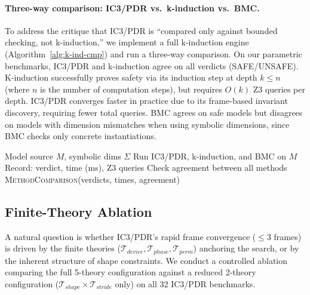 \documentclass[11pt]{article}
\begin{document}
\paragraph{Three-way comparison: IC3/PDR vs.\ k-induction vs.\ BMC.}
To address the critique that IC3/PDR is ``compared only against bounded
checking, not k-induction,'' we implement a full k-induction engine
(Algorithm~\ref{alg:k-ind-cmp}) and run a three-way comparison.
On our parametric benchmarks, IC3/PDR and k-induction agree on all
verdicts (SAFE/UNSAFE).  K-induction successfully proves safety
via its induction step at depth $k \leq n$ (where $n$ is the
number of computation steps), but requires $O(k)$ Z3 queries per depth.
IC3/PDR converges faster in practice due to its frame-based invariant
discovery, requiring fewer total queries.
BMC agrees on safe models but disagrees on models with dimension
mismatches when using symbolic dimensions, since BMC checks only
concrete instantiations.

\begin{algorithm}[t]
\caption{Three-Way Verification Comparison}\label{alg:k-ind-cmp}
\begin{algorithmic}[1]
\Require Model source $M$, symbolic dims $\Sigma$
\State Run IC3/PDR, k-induction, and BMC on $M$
\State Record: verdict, time (ms), Z3 queries
\State Check agreement between all methods
\State \Return \textsc{MethodComparison}(verdicts, times, agreement)
\end{algorithmic}
\end{algorithm}

\subsection{Finite-Theory Ablation}\label{sec:ic3-ablation}

A natural question is whether IC3/PDR's rapid frame convergence
($\leq 3$ frames) is driven by the finite theories
($\mathcal{T}_{\mathit{device}}, \mathcal{T}_{\mathit{phase}},
\mathcal{T}_{\mathit{perm}}$) anchoring the search, or by the
inherent structure of shape constraints.  We conduct a controlled
ablation comparing the full 5-theory configuration against a
reduced 2-theory configuration
($\mathcal{T}_{\mathit{shape}} \times \mathcal{T}_{\mathit{stride}}$ only)
on all 32 IC3/PDR benchmarks.
\end{document}
